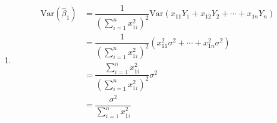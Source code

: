 \documentclass[answers]{exam}
\begin{document}
\begin{questions}
\begin{solution}
\begin{enumerate}
      \item \begin{align}
        \mathrm{Var}\left(\widehat{\beta}_{1}\right) &= \dfrac{1}{\left(\sum_{i=1}^{n}x_{1i}^{2}\right)^{2}}\mathrm{Var}\left(x_{11}Y_{1}+x_{12}Y_{2}+\cdots +x_{1n}Y_{n}\right)\\
        &= \dfrac{1}{\left(\sum_{i=1}^{n}x_{1i}^{2}\right)^{2}}\left(x_{11}^{2}\sigma^{2}+\cdots + x_{1n}^{2}\sigma^{2}\right)\\
        &= \dfrac{\sum_{i=1}^{n}x_{1i}^{2}}{\left(\sum_{i=1}^{n}x_{1i}^{2}\right)^{2}}\sigma^{2}\\
        &= \dfrac{\sigma^{2}}{\sum_{i=1}^{n}x_{1i}^{2}}
      \end{align}
    \end{enumerate}
   \end{solution}
\end{questions}
\end{document}
